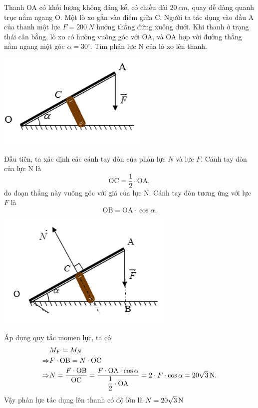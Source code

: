 \begin{enumerate}[label=\bfseries Câu \arabic*:]
	\cauhoi
	{Thanh OA có khối lượng không đáng kể, có chiều dài $\SI{20}{cm}$, quay dễ dàng quanh trục nằm ngang O. Một lò xo gắn vào điểm giữa C. Người ta tác dụng vào đầu A của thanh một lực $F=\SI{200}{N}$ hướng thẳng đứng xuống dưới. Khi thanh ở trạng thái cân bằng, lò xo có hướng vuông góc với OA, và OA hợp với đường thẳng nằm ngang một góc $\alpha=30^{\circ}$. Tìm phản lực N của lò xo lên thanh. 
		\begin{center}
			\includegraphics[scale=1]{../figs/VN10-2021-PH-TP021-3.png}
		\end{center}
	}
	
	\loigiai
	{Đầu tiên, ta xác định các cánh tay đòn của phản lực $N$ và lực $F$. Cánh tay đòn của lực N là 
		\begin{equation*}
			\textrm{OC} = \dfrac{1}{2}\cdot \textrm{OA},
		\end{equation*}
		do đoạn thẳng này vuông góc với giá của lực N. Cánh tay đòn tương ứng với lực $F$ là
		\begin{equation*}
			\textrm{OB} = \textrm{OA}\cdot \cos\alpha.
		\end{equation*}
		\begin{center}
			\includegraphics[scale=1]{../figs/VN10-2021-PH-TP021-4.png}
		\end{center}
		Áp dụng quy tắc momen lực, ta có 
		\begin{align*}
			&M_F=M_N\\
			\Rightarrow& F\cdot \textrm{OB} = N\cdot \textrm{OC}\\
			\Rightarrow& N  = \dfrac{F\cdot \textrm{OB}}{\textrm{OC}}
			=
			\dfrac{F\cdot \textrm{OA}\cdot \cos\alpha}{\dfrac{1}{2}\cdot \textrm{OA}}
			=2\cdot F\cdot \cos\alpha = \SI[parse-numbers=false]{20\sqrt{3}}{N}.
		\end{align*}
		Vậy phản lực tác dụng lên thanh có độ lớn là $N=\SI[parse-numbers=false]{20\sqrt{3}}{N}$
	}
\end{enumerate}